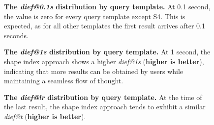 \begin{figure}
    \centering
    
    \caption{
    \textbf{The \textit{dief@0.1s} distribution by query template.}    
    At 0.1 second, the value is zero for every query template except S4. This is expected, as for all other templates the first result arrives after 0.1 seconds.}
    \label{fig:dief_01}
\end{figure}

\begin{figure}
    \centering
    
    \caption{
    \textbf{The \textit{dief@1s} distribution by query template.}    
    At 1 second, the shape index approach shows a higher \textit{dief@1s} (\textbf{higher is better}), indicating that more results can be obtained by users while maintaining a seamless flow of thought.}
    \label{fig:dief_1}
\end{figure}


\begin{figure}
    \centering
    
    \caption{
    \textbf{The \textit{dief@lr} distribution by query template.}    
    At the time of the last result, the shape index approach tends to exhibit a similar \textit{dief@t} (\textbf{higher is better}).}
    \label{fig:dief_lr}
\end{figure}

